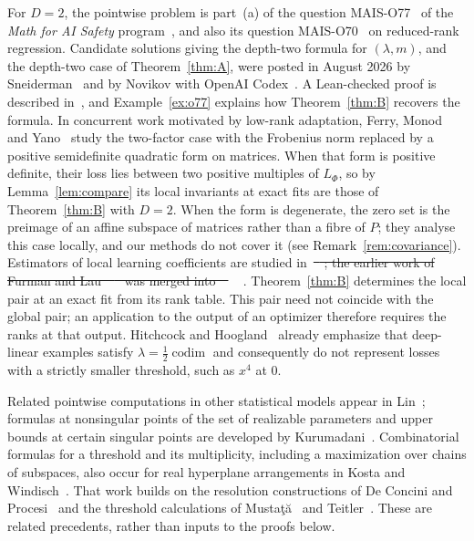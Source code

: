 \documentclass[11pt,a4paper]{article}
\theoremstyle{definition}
\theoremstyle{remark}
\numberwithin{equation}{section}
\newcommand{\codim}{\operatorname{codim}}
\providecommand{\DIFaddtex}[1]{{\protect\color{blue}#1}} %
\providecommand{\DIFdeltex}[1]{{\protect\color{red}\sout{#1}}} %
\providecommand{\DIFaddbegin}{} %
\providecommand{\DIFaddend}{} %
\providecommand{\DIFdelbegin}{} %
\providecommand{\DIFdelend}{} %
\providecommand{\DIFadd}[1]{\texorpdfstring{\DIFaddtex{#1}}{#1}} %
\providecommand{\DIFdel}[1]{\texorpdfstring{\DIFdeltex{#1}}{}} %
\begin{document}
For $D=2$, the pointwise problem is part~(a) of the question MAIS-O77~\cite{mais-o77} of the \emph{Math for AI Safety} program~\cite{levine-mais,mais-repo}, and also its question MAIS-O70~\cite{mais-o70} on reduced-rank regression. Candidate solutions giving the depth-two formula for $(\lambda,m)$, and the depth-two case of Theorem~\ref{thm:A}, were posted in August 2026 by Sneiderman~\cite{mais-issue-3} and by Novikov with OpenAI Codex~\cite{mais-issue-12}. A Lean-checked proof is described in~\cite{feld-o77}, and Example~\ref{ex:o77} explains how Theorem~\ref{thm:B} recovers the formula. In concurrent work motivated by low-rank adaptation, Ferry, Monod and Yano~\cite{ferry-monod-yano} study the two-factor case with the Frobenius norm replaced by a positive semidefinite quadratic form on matrices. When that form is positive definite, their loss lies between two positive multiples of $L_\Phi$, so by Lemma~\ref{lem:compare} its local invariants at exact fits are those of Theorem~\ref{thm:B} with $D=2$. When the form is degenerate, the zero set is the preimage of an affine subspace of matrices rather than a fibre of $P$; they analyse this case locally, and our methods do not cover it (see Remark~\ref{rem:covariance}). Estimators of local learning coefficients are studied in~\DIFdelbegin \DIFdel{\mbox{%
\cite{lau-llc,hitchcock-hoogland}}\hskip0pt%
; the earlier work of Furman and Lau~\mbox{%
\cite{furman-lau} }\hskip0pt%
was merged into~\mbox{%
\cite{lau-llc}}\hskip0pt%
}\DIFdelend \DIFaddbegin \DIFadd{\mbox{%
\cite{furman-lau,lau-llc,hitchcock-hoogland}}\hskip0pt%
}\DIFaddend . Theorem~\ref{thm:B} determines the local pair at an exact fit from its rank table. This pair need not coincide with the global pair; an application to the output of an optimizer therefore requires the ranks at that output. Hitchcock and Hoogland~\cite[Remark~B.6]{hitchcock-hoogland} already emphasize that deep-linear examples satisfy $\lambda=\tfrac12\codim$ and consequently do not represent losses with a strictly smaller threshold, such as $x^4$ at $0$.

Related pointwise computations in other statistical models appear in Lin~\cite[Section~5]{lin}; formulas at nonsingular points of the set of realizable parameters and upper bounds at certain singular points are developed by Kurumadani~\cite{kurumadani,kurumadani-upper}. Combinatorial formulas for a threshold and its multiplicity, including a maximization over chains of subspaces, also occur for real hyperplane arrangements in Kosta and Windisch~\cite[Theorem~4.2 and Corollary~4.4]{kosta-windisch}. That work builds on the resolution constructions of De Concini and Procesi~\cite{deconcini-procesi} and the threshold calculations of Mustaţă~\cite{mustata-arrangements} and Teitler~\cite{teitler}. These are related precedents, rather than inputs to the proofs below.
\end{document}
